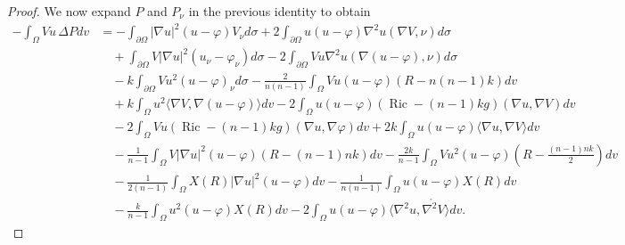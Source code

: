 \documentclass[reqno,11pt]{amsart}
\numberwithin{equation}{section}  %
\begin{document}
\begin{proof}
We now expand \(P\) and \(P_{\nu}\) in the previous identity to obtain
\begin{align}\label{eq412}
-\int_{\Omega}Vu\,\Delta P dv
&=
-\int_{\partial\Omega}|\nabla u|^{2}(u-\varphi)V_{\nu} d\sigma
+2\int_{\partial\Omega}u(u-\varphi)\nabla^{2}u(\nabla V,\nu) d\sigma
\nonumber\\
&\quad
+\int_{\partial\Omega}V|\nabla u|^{2}(u_{\nu}-\varphi_{\nu}) d\sigma
-2\int_{\partial\Omega}Vu\nabla^{2}u(\nabla(u-\varphi),\nu) d\sigma
\nonumber\\
&\quad
-k\int_{\partial\Omega}Vu^{2}(u-\varphi)_{\nu} d\sigma
-\frac{2}{n(n-1)}
\int_{\Omega}Vu(u-\varphi)(R-n(n-1)k)dv
\nonumber\\
&\quad
+k\int_{\Omega}u^{2}\langle\nabla V,\nabla(u-\varphi)\rangle dv
-2\int_{\Omega}u(u-\varphi)(\operatorname{Ric}-(n-1)kg)(\nabla u,\nabla V)dv
\nonumber\\
&\quad
-2\int_{\Omega}Vu(\operatorname{Ric}-(n-1)kg)(\nabla u,\nabla\varphi) dv
+2k\int_{\Omega}u(u-\varphi)\langle\nabla u,\nabla V\rangle dv
\nonumber\\
&\quad
-\frac{1}{n-1}
\int_{\Omega}V|\nabla u|^{2}(u-\varphi)(R-(n-1)nk) dv
-\frac{2k}{n-1}
\int_{\Omega}Vu^{2}(u-\varphi)
\left(R-\frac{(n-1)nk}{2}\right) dv
\nonumber\\
&\quad
-\frac{1}{2(n-1)}
\int_{\Omega}X(R)|\nabla u|^{2}(u-\varphi)dv
-\frac{1}{n(n-1)}
\int_{\Omega}u(u-\varphi)X(R)dv
\nonumber\\
&\quad
-\frac{k}{n-1}
\int_{\Omega}u^{2}(u-\varphi)X(R)dv
-2\int_{\Omega}u(u-\varphi)
\langle\nabla^{2}u,\mathring{\nabla^{2}V}\rangle dv.
\end{align}


\end{proof}
\end{document}
